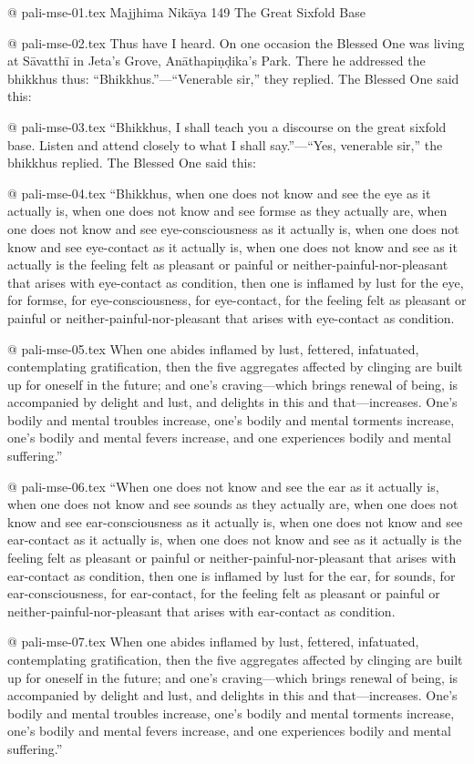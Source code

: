 @ pali-mse-01.tex
Majjhima Nikāya 149
The Great Sixfold Base

@ pali-mse-02.tex
Thus have I heard. On one occasion the Blessed One was living at Sāvatthī in Jeta’s Grove, Anāthapiṇḍika’s Park. There he addressed the bhikkhus thus: “Bhikkhus.”—“Venerable sir,” they replied. The Blessed One said this:

@ pali-mse-03.tex
“Bhikkhus, I shall teach you a discourse on the great sixfold base. Listen and attend closely to what I shall say.”—“Yes, venerable sir,” the bhikkhus replied. The Blessed One said this:

@ pali-mse-04.tex
“Bhikkhus, when one does not know and see the eye as it actually is, when one does not know and see formse as they actually are, when one does not know and see eye-consciousness as it actually is, when one does not know and see eye-contact as it actually is, when one does not know and see as it actually is the feeling felt as pleasant or painful or neither-painful-nor-pleasant that arises with eye-contact as condition, then one is inflamed by lust for the eye, for formse, for eye-consciousness, for eye-contact, for the feeling felt as pleasant or painful or neither-painful-nor-pleasant that arises with eye-contact as condition.

@ pali-mse-05.tex
When one abides inflamed by lust, fettered, infatuated, contemplating gratification, then the five aggregates affected by clinging are built up for oneself in the future; and one’s craving—which brings renewal of being, is accompanied by delight and lust, and delights in this and that—increases. One’s bodily and mental troubles increase, one’s bodily and mental torments increase, one’s bodily and mental fevers increase, and one experiences bodily and mental suffering.”

@ pali-mse-06.tex
“When one does not know and see the ear as it actually is, when one does not know and see sounds as they actually are, when one does not know and see ear-consciousness as it actually is, when one does not know and see ear-contact as it actually is, when one does not know and see as it actually is the feeling felt as pleasant or painful or neither-painful-nor-pleasant that arises with ear-contact as condition, then one is inflamed by lust for the ear, for sounds, for ear-consciousness, for ear-contact, for the feeling felt as pleasant or painful or neither-painful-nor-pleasant that arises with ear-contact as condition.

@ pali-mse-07.tex
When one abides inflamed by lust, fettered, infatuated, contemplating gratification, then the five aggregates affected by clinging are built up for oneself in the future; and one’s craving—which brings renewal of being, is accompanied by delight and lust, and delights in this and that—increases. One’s bodily and mental troubles increase, one’s bodily and mental torments increase, one’s bodily and mental fevers increase, and one experiences bodily and mental suffering.”


